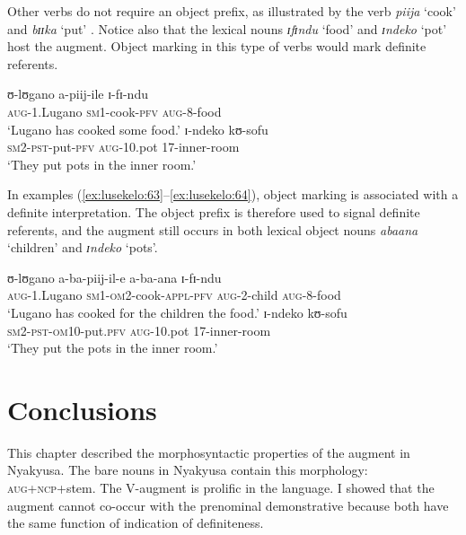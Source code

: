 \documentclass[output=paper]{langscibook}
\begin{document}
Other verbs do not require an object prefix, as illustrated by the verb \textit{piija} ‘cook’  and \textit{bɪɪka} ‘put’ . Notice also that the lexical nouns \textit{ɪ{}fɪ{}ndu} ‘food’ and \textit{ɪndeko} ‘pot’ host the augment. Object marking in this type of verbs would mark definite referents. 

\ea%
    \label{ex:lusekelo:61}
\gll  ʊ{}-lʊgano    a-piij-ile  ɪ{}-fɪ{}-ndu\\
  \textsc{aug}-1.Lugano  \textsc{sm}1-cook-\textsc{pfv}   \textsc{aug}-8-food\\
\glt ‘Lugano has cooked some food.’ 
\ex \label{ex:lusekelo:62}
  ɪ{}-ndeko  kʊ-sofu\\
  \textsc{sm}2-\textsc{pst}-put-\textsc{pfv}  \textsc{aug}-10.pot  17-inner-room \\
\glt  ‘They put pots in the inner room.’ 
\z

In examples (\ref{ex:lusekelo:63}--\ref{ex:lusekelo:64}), object marking is associated with a definite interpretation. The object prefix is therefore used to signal definite referents, and the augment still occurs in both lexical object nouns \textit{abaana} ‘children’ and \textit{ɪndeko} ‘pots’. 

\ea%
    \label{ex:lusekelo:63}
\gll   ʊ{}-lʊgano    a-ba-piij-il-e    a-ba-ana    ɪ{}-fɪ{}-ndu\\
  \textsc{aug}-1.Lugano  \textsc{sm}1-\textsc{om}2-cook-\textsc{appl}-\textsc{pfv}   \textsc{aug}-2-child   \textsc{aug}-8-food\\
 \glt ‘Lugano has cooked for the children the food.’ 
\ex \label{ex:lusekelo:64} 
  ɪ{}-ndeko  kʊ-sofu\\
  \textsc{sm}2-\textsc{pst}-\textsc{om}10-put.\textsc{pfv}  \textsc{aug}-10.pot  17-inner-room \\
\glt  ‘They put the pots in the inner room.’ \citep{Lusekelo2012}
\z

\largerpage
\section{Conclusions} \label{sec:lusekelo:5}

This chapter described the morphosyntactic properties of the augment in Nyakyusa. The bare nouns in Nyakyusa contain this morphology: \textsc{aug}+\textsc{ncp}+stem. The V-aug\-ment is prolific in the language. I showed that the augment cannot co-occur with the prenominal demonstrative because both have the same function of indication of definiteness. 
\end{document}
